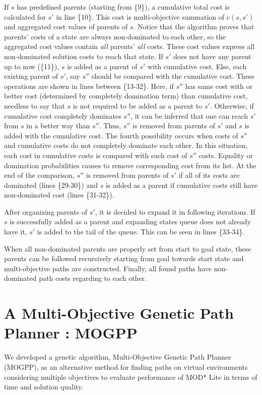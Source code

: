 \documentclass[10pt,journal]{IEEEtran}
\begin{document}
If $s$ has predefined parents (starting from \{9\}), a cumulative total cost is calculated for $s'$ in line \{10\}. This cost is multi-objective summation of $c(s, s')$ and aggregated cost values of parents of $s$. Notice that the algorithm proves that parents' costs of a state are always non-dominated to each other, so the aggregated cost values contain \textit{all} parents' \textit{all} costs. These cost values express all non-dominated solution costs to reach that state. If $s'$ does not have any parent up to now (\{11\}), $s$ is added as a parent of $s'$ with cumulative cost. Else, each existing parent of $s'$, say $s''$ should be compared with the cumulative cost. These operations are shown in lines between \{13-32\}. Here, if $s''$ has same cost with or better cost (determined by completely domination term) than cumulative cost, needless to say that $s$ is not required to be added as a parent to $s'$. Otherwise, if cumulative cost completely dominates $s''$, it can be inferred that one can reach $s'$ from $s$ in a better way than $s''$. Thus, $s''$ is removed from parents of $s'$ and $s$ is added with the cumulative cost. The fourth possibility occurs when costs of $s''$ and cumulative costs do not completely dominate each other. In this situation, each cost in cumulative costs is compared with each cost of $s''$ costs. Equality or domination probabilities causes to remove corresponding cost from its list. At the end of the comparison, $s''$ is removed from parents of $s'$ if all of its costs are dominated (lines \{29-30\}) and $s$ is added as a parent if cumulative costs still have non-dominated cost (lines \{31-32\}).

After organizing parents of $s'$, it is decided to expand it in following iterations. If $s$ is successfully added as a parent and expanding states queue does not already have it, $s'$ is added to the tail of the queue. This can be seen in lines \{33-34\}.

When all non-dominated parents are properly set from start to goal state, these parents can be followed recursively starting from goal towards start state and multi-objective paths are constructed. Finally, all found paths have non-dominated path costs regarding to each other.

\section{A Multi-Objective Genetic Path Planner : MOGPP}

We developed a genetic algorithm, Multi-Objective Genetic Path Planner (MOGPP), as an alternative method for finding paths on virtual environments considering multiple objectives to evaluate performance of MOD* Lite in terms of time and solution quality. 
\end{document}
